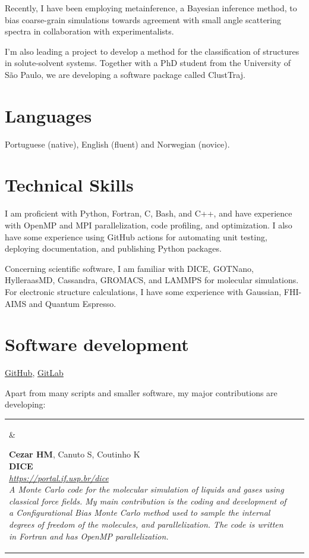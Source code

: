 \documentclass[10pt]{article}
\newcommand{\newsoftware}[3]{
\begin{adjustwidth}{-1in}{-1in}  
\begin{tabular}{p{0.9in}p{7in}}
\parbox[c]{0.9in}{} & \parbox[c]{6in}{\setstretch{0.9} {\scriptsize {#1}} \\ {\bf #2}  \\ {\footnotesize\emph {#3}}}
\end{tabular}
\end{adjustwidth}
\vspace{0.2in}
}
\begin{document}
Recently, I have been employing metainference, a Bayesian inference method, to bias coarse-grain simulations towards agreement with small angle scattering spectra in collaboration with experimentalists.

I'm also leading a project to develop a method for the classification of structures in solute-solvent systems.
Together with a PhD student from the University of S\~ao Paulo, we are developing a software package called ClustTraj.

\section*{Languages}
Portuguese (native), English (fluent) and Norwegian (novice).

\section*{Technical Skills}
I am proficient with Python, Fortran, C, Bash, and C++, and have experience with OpenMP and MPI parallelization, code profiling, and optimization. 
I also have some experience using GitHub actions for automating unit testing, deploying documentation, and publishing Python packages.

Concerning scientific software, I am familiar with DICE, GOTNano, HylleraasMD, Cassandra, GROMACS, and LAMMPS for molecular simulations. 
For electronic structure calculations, I have some experience with Gaussian, FHI-AIMS and Quantum Espresso.


\eject



\section*{Software development}
\href{https://github.com/hmcezar}{GitHub}, 
\href{https://gitlab.com/hmcezar}{GitLab}

Apart from many scripts and smaller software, my major contributions are developing:\\

\newsoftware{\textbf{Cezar HM}, Canuto S, Coutinho K}{DICE}{\href{https://portal.if.usp.br/dice}{https://portal.if.usp.br/dice} \\ 
A Monte Carlo code for the molecular simulation of liquids and gases using classical force fields. My main contribution is the coding and development of a Configurational Bias Monte Carlo method used to sample the internal degrees of freedom of the molecules, and parallelization. The code is written in Fortran and has OpenMP parallelization.}
\end{document}
